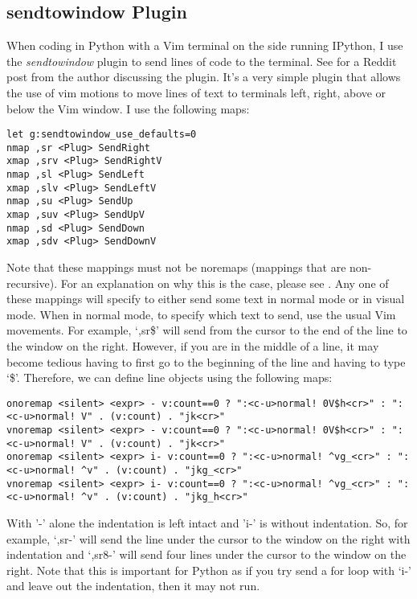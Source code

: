 \documentclass[10pt]{article}
\begin{document}
\subsection{sendtowindow Plugin}
When coding in Python with a Vim terminal on the side running IPython, I use the
\textit{sendtowindow} plugin \cite{KKPMW2016send} to send lines of code to the
terminal. See \cite{KKPMW2019send} for a Reddit post from the author discussing
the plugin. It's a very simple plugin that allows the use of vim motions to move
lines of text to terminals left, right, above or below the Vim window. I use the
following maps:\\
\begin{lstlisting}
let g:sendtowindow_use_defaults=0
nmap ,sr <Plug> SendRight
xmap ,srv <Plug> SendRightV
nmap ,sl <Plug> SendLeft
xmap ,slv <Plug> SendLeftV
nmap ,su <Plug> SendUp
xmap ,suv <Plug> SendUpV
nmap ,sd <Plug> SendDown
xmap ,sdv <Plug> SendDownV
\end{lstlisting}
Note that these mappings must not be noremaps (mappings that are non-recursive). For an
explanation on why this is the case, please see \cite{justrajdeep2018please}.
Any one of these mappings will specify to either send some text in normal mode
or in visual mode. When in normal mode, to specify which text to send, use the
usual Vim movements. For example, `,sr\$' will send from the cursor to the end
of the line to the window on the right. However, if you are in the middle of a
line, it may become tedious having to first go to the beginning of the line and
having to type `\$'. Therefore, we can define line objects using the following
maps:
\begin{lstlisting}
onoremap <silent> <expr> - v:count==0 ? ":<c-u>normal! 0V$h<cr>" : ":<c-u>normal! V" . (v:count) . "jk<cr>"
vnoremap <silent> <expr> - v:count==0 ? ":<c-u>normal! 0V$h<cr>" : ":<c-u>normal! V" . (v:count) . "jk<cr>"
onoremap <silent> <expr> i- v:count==0 ? ":<c-u>normal! ^vg_<cr>" : ":<c-u>normal! ^v" . (v:count) . "jkg_<cr>"
vnoremap <silent> <expr> i- v:count==0 ? ":<c-u>normal! ^vg_<cr>" : ":<c-u>normal! ^v" . (v:count) . "jkg_h<cr>"
\end{lstlisting}
With '-' alone the indentation is left intact and 'i-' is without indentation.
So, for example, `,sr-' will send the line under the cursor to the window on
the right with indentation and `,sr8-' will send four lines under the cursor to
the window on the right. Note that this is important for Python as if you try
send a for loop with `i-' and leave out the indentation, then it may not run.\\
\end{document}
